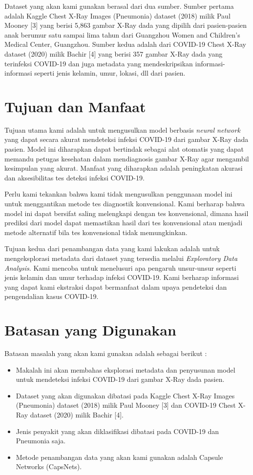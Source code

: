 \documentclass{article}
\begin{document}
   Dataset yang akan kami gunakan berasal dari dua sumber. Sumber pertama adalah  Kaggle Chest X-Ray Images (Pneumonia) dataset (2018) milik Paul Mooney [3] yang berisi 5,863 gambar X-Ray dada yang dipilih dari pasien-pasien anak berumur satu sampai lima tahun dari Guangzhou Women and Children’s Medical Center, Guangzhou. Sumber kedua adalah dari COVID-19 Chest X-Ray dataset (2020) milik Bachir [4] yang berisi 357 gambar X-Ray dada yang terinfeksi COVID-19 dan juga metadata yang mendeskripsikan informasi-informasi seperti jenis kelamin, umur, lokasi, dll dari pasien. 
   
   \section{Tujuan dan Manfaat}
   Tujuan utama kami adalah untuk mengusulkan model berbasis \textit{neural network} yang dapat secara akurat mendeteksi infeksi COVID-19 dari gambar X-Ray dada pasien. Model ini diharapkan dapat bertindak sebagai alat otomatis yang dapat memandu petugas kesehatan dalam mendiagnosis gambar X-Ray agar mengambil kesimpulan yang akurat. Manfaat yang diharapkan adalah peningkatan akurasi dan aksesibilitas tes deteksi infeksi COVID-19. \par
   Perlu kami tekankan bahwa kami tidak mengusulkan penggunaan model ini untuk menggantikan metode tes diagnostik konvensional. Kami berharap bahwa model ini dapat bersifat saling melengkapi dengan tes konvensional, dimana hasil prediksi dari model dapat memastikan hasil dari tes konvensional atau menjadi metode alternatif bila tes konvensional tidak memungkinkan. \par
   Tujuan kedua dari penambangan data yang kami lakukan adalah untuk mengeksplorasi metadata dari dataset yang tersedia melalui \textit{Exploratory Data Analysis}. Kami mencoba untuk menelusuri apa pengaruh unsur-unsur seperti jenis kelamin dan umur terhadap infeksi COVID-19. Kami berharap informasi yang dapat kami ekstraksi dapat bermanfaat dalam upaya pendeteksi dan pengendalian kasus COVID-19.
   
   \section{Batasan yang Digunakan}
   Batasan masalah yang akan kami gunakan adalah sebagai berikut :
   
   \begin{itemize}
   	\item Makalah ini akan membahas eksplorasi metadata dan penyusunan model untuk mendeteksi infeksi COVID-19 dari gambar X-Ray dada pasien.
   	\item Dataset yang akan digunakan dibatasi pada Kaggle Chest X-Ray Images (Pneumonia) dataset (2018) milik Paul Mooney [3] dan COVID-19 Chest X-Ray dataset (2020) milik Bachir [4].
   	\item Jenis penyakit yang akan diklasifikasi dibatasi pada COVID-19 dan Pneumonia saja.
   	\item Metode penambangan data yang akan kami gunakan adalah Capsule Networks (CapsNets).
   \end{itemize}
\end{document}
